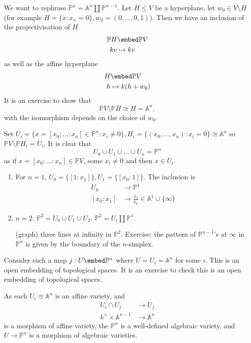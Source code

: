 \documentclass[a4paper]{article}
\renewcommand{\A}{\mathbb{A}}
\renewcommand*{\P}{\mathbb{P}}
\begin{document}
We want to rephrase \(\P^n = \A^n \amalg \P^{n - 1}\). Let \(H \leq V\) be a hyperplane, let \(w_0 \in V \setminus H\) (for example \(H = \{x: x_n = 0\}, w_0 = (0, \dots, 0, 1)\)). Then we have an inclusion of the projectivisation of \(H\)
\begin{align*}
  \P H &\embed \P V \\
  kv &\mapsto kv
\end{align*}
as well as the affine hyperplane
\begin{align*}
  H &\embed \P V \\
  h &\mapsto k(h + w_0)
\end{align*}
It is an exercise to show that
\[
  \P V \setminus \P H \cong H = \A^n,
\]
with the isomorphism depends on the choice of \(w_0\).

Set \(U_i = \{x = [x_0: \dots : x_n] \in \P^n: x_i \neq 0\}, H_i = \{(x_0, \dots, x_n): x_i = 0\} \cong \A^n\) so \(\P V \setminus \P H_i = U_i\). It is clear that
\[
  U_0 \cup U_1 \cup \dots \cup U_n = \P^n
\]
as if \(x = [x_0 : \dots : x_n] \in \P V\), some \(x_i \neq 0\) and then \(x \in U_i\).

\begin{eg}\leavevmode
  \begin{enumerate}
  \item For \(n = 1\), \(U_0 = \{[1: x_1]\}, U_1 = \{[x_0 : 1]\}\). The inclusion is
    \begin{align*}
      U_0 &\to \P^1 \\
      [x_0 : x_1] &\to \frac{x_1}{x_0} \in \A^1 \cup \{\infty\}
    \end{align*}
  \item \(n = 2\): \(\P^2 = U_0 \cup U_1 \cup U_2\). \(\P^2 = U_i \amalg \P^1\).

    (graph) three lines at infinity in \(\P^2\). Exercise: the pattern of \(\P^{n - 1}\)'s at \(\infty\) in \(\P^n\) is given by the boundary of the \(n\)-simplex.
  \end{enumerate}
\end{eg}

Consider such a map \(j: U \embed \P^n\) where \(U = U_i = \A^n\) for some \(i\). This is an open embedding of topological spaces. It is an exercise to check this is an open embedding of topological spaces.

As each \(U_i \cong \A^n\) is an affine variety, and
\begin{align*}
  U_i \cap U_j &\to U_j \\
  k^\times \times \A^{n - 1} &\to \A^n
\end{align*}
is a morphism of affine variety, the \(\P^n\) is a well-defined algebraic variety, and \(U \to \P^n\) is a morphism of algebraic varieties.
\end{document}

